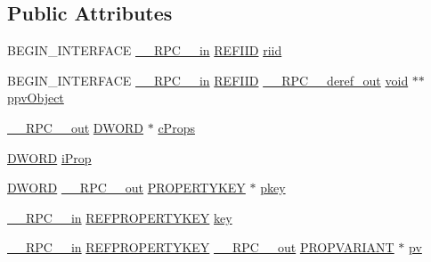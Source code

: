 \subsection*{Public Attributes}
\begin{DoxyCompactItemize}
\item 
B\+E\+G\+I\+N\+\_\+\+I\+N\+T\+E\+R\+F\+A\+CE \hyperlink{rpcsal_8h_a20b7f6da600a05c8b541659f14f7f0e6}{\+\_\+\+\_\+\+R\+P\+C\+\_\+\+\_\+in} \hyperlink{px__win__ds_8c_a80ec49c8ae61e234197d5071d2df497d}{R\+E\+F\+I\+ID} \hyperlink{struct_i_property_store_cache_vtbl_a55ca244645919429c42ae7997e00354f}{riid}
\item 
B\+E\+G\+I\+N\+\_\+\+I\+N\+T\+E\+R\+F\+A\+CE \hyperlink{rpcsal_8h_a20b7f6da600a05c8b541659f14f7f0e6}{\+\_\+\+\_\+\+R\+P\+C\+\_\+\+\_\+in} \hyperlink{px__win__ds_8c_a80ec49c8ae61e234197d5071d2df497d}{R\+E\+F\+I\+ID} \hyperlink{rpcsal_8h_a23bc188526f10656f9c79d950f6c3192}{\+\_\+\+\_\+\+R\+P\+C\+\_\+\+\_\+deref\+\_\+out} \hyperlink{sound_8c_ae35f5844602719cf66324f4de2a658b3}{void} $\ast$$\ast$ \hyperlink{struct_i_property_store_cache_vtbl_aa8d819b5ae1e4eb3a204911e56123eb9}{ppv\+Object}
\item 
\hyperlink{rpcsal_8h_aa518a2c78d44d75f3685c32c455c5ed8}{\+\_\+\+\_\+\+R\+P\+C\+\_\+\+\_\+out} \hyperlink{mapinls_8h_ad342ac907eb044443153a22f964bf0af}{D\+W\+O\+RD} $\ast$ \hyperlink{struct_i_property_store_cache_vtbl_ae3e84b0bb58faba6e302096029374f4b}{c\+Props}
\item 
\hyperlink{mapinls_8h_ad342ac907eb044443153a22f964bf0af}{D\+W\+O\+RD} \hyperlink{struct_i_property_store_cache_vtbl_a6aa3c42f49fad897426883183212beda}{i\+Prop}
\item 
\hyperlink{mapinls_8h_ad342ac907eb044443153a22f964bf0af}{D\+W\+O\+RD} \hyperlink{rpcsal_8h_aa518a2c78d44d75f3685c32c455c5ed8}{\+\_\+\+\_\+\+R\+P\+C\+\_\+\+\_\+out} \hyperlink{pa__win__wasapi_8c_aa83c2fbe06e13eff5ff331ba4a302659}{P\+R\+O\+P\+E\+R\+T\+Y\+K\+EY} $\ast$ \hyperlink{struct_i_property_store_cache_vtbl_ac908a8738f7ca790f5328d5fd978b63b}{pkey}
\item 
\hyperlink{rpcsal_8h_a20b7f6da600a05c8b541659f14f7f0e6}{\+\_\+\+\_\+\+R\+P\+C\+\_\+\+\_\+in} \hyperlink{propkeydef_8h_a3e01280fe3a0b979f5a1926d5a8754af}{R\+E\+F\+P\+R\+O\+P\+E\+R\+T\+Y\+K\+EY} \hyperlink{struct_i_property_store_cache_vtbl_a628d05cf6b8ab9a773234a515ef01a13}{key}
\item 
\hyperlink{rpcsal_8h_a20b7f6da600a05c8b541659f14f7f0e6}{\+\_\+\+\_\+\+R\+P\+C\+\_\+\+\_\+in} \hyperlink{propkeydef_8h_a3e01280fe3a0b979f5a1926d5a8754af}{R\+E\+F\+P\+R\+O\+P\+E\+R\+T\+Y\+K\+EY} \hyperlink{rpcsal_8h_aa518a2c78d44d75f3685c32c455c5ed8}{\+\_\+\+\_\+\+R\+P\+C\+\_\+\+\_\+out} \hyperlink{propidl_8h_ae902c1757cd16052896846fa4ebb88d8}{P\+R\+O\+P\+V\+A\+R\+I\+A\+NT} $\ast$ \hyperlink{struct_i_property_store_cache_vtbl_a4e28dfadad1e0ac54548f8843a65378a}{pv}
$$
\end{DoxyCompactItemize}

